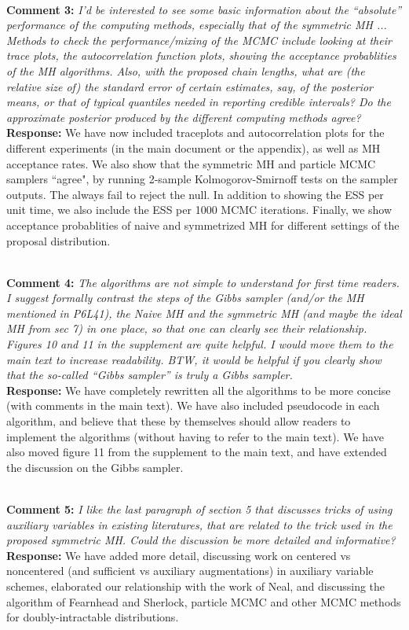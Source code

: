 \documentclass[11pt]{article}
\newcommand{\rev}[2]{\textbf{Comment #1: }\emph{#2}}
\newcommand{\resp}{\textbf{Response: }}
\begin{document}
~\\ 
\rev{3}{I’d be interested to see some basic information about the “absolute” performance of the computing methods, especially that of the symmetric MH ... Methods to check the performance/mixing of the MCMC include looking at their trace plots, the autocorrelation function plots, showing the acceptance probablities of the MH algorithms. Also, with the proposed chain lengths, what are (the relative size of) the standard error of certain estimates, say, of the posterior means, or that of typical quantiles needed in reporting credible intervals? Do the approximate posterior produced by the different computing methods agree? }
\\
\resp We have now included traceplots and autocorrelation plots for the different experiments (in the main document or the appendix), as well as MH acceptance rates. We also show that the symmetric MH and particle MCMC samplers ``agree", by running 2-sample Kolmogorov-Smirnoff tests on the sampler outputs. The always fail to reject the null.
In addition to showing the ESS per unit time, we also include the ESS per 1000 MCMC iterations. 
Finally, we show acceptance probablities of naive and symmetrized MH for different settings of the proposal distribution.

~\\
\rev{4}{The algorithms are not simple to understand for first time readers. I suggest formally contrast the steps of the Gibbs sampler (and/or the MH mentioned in P6L41), the Naive MH and the symmetric MH (and maybe the ideal MH from sec 7) in one place, so that one can clearly see their relationship.  Figures 10 and 11 in the supplement are quite helpful. I would move them to the main text to increase readability.
BTW, it would be helpful if you clearly show that the so-called “Gibbs sampler” is truly a Gibbs sampler.}
\\ 
\resp We have completely rewritten all the algorithms to be more concise (with comments in the main text). We have also included pseudocode in each algorithm, and believe that these by themselves should allow readers to implement the algorithms (without having to refer to the main text). We have also moved figure 11 from the supplement to the main text, and have extended the discussion on the Gibbs sampler.

~\\
\noindent \rev{5}{I like the last paragraph of section 5 that discusses tricks of using auxiliary variables in
existing literatures, that are related to the trick used in the proposed symmetric MH.
Could the discussion be more detailed and informative?
} \\
\resp{We have added more detail, discussing work on centered vs noncentered (and sufficient vs auxiliary augmentations) in auxiliary variable schemes, elaborated our relationship with the work of Neal, and discussing the algorithm of Fearnhead and Sherlock, particle MCMC and other MCMC methods for doubly-intractable distributions.}
\end{document}
